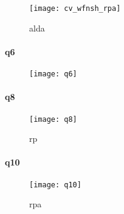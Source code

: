 \begin{figure}[!h]\label{CVwfnshRPA}
    \centering
    \texttt{[image: cv\_wfnsh\_rpa]}
    \caption{alda}
\end{figure}

\paragraph{q6}
\begin{figure}[!h]
    \centering
    \texttt{[image: q6]}
    \caption{}
\end{figure}


\paragraph{q8}
\begin{figure}[!h]
    \centering
    \texttt{[image: q8]}
    \caption{rp}
\end{figure}


\paragraph{q10}
\begin{figure}[!h]
    \centering
    \texttt{[image: q10]}
    \caption{rpa}
\end{figure}